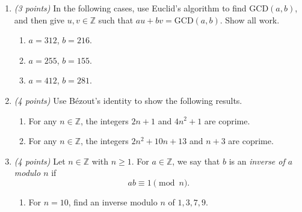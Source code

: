 \documentclass[12pt]{article}
\newcommand{\GCD}{\mathrm{GCD}}
\begin{document}
\begin{enumerate}

\item \emph{(3 points)} In the following cases, use Euclid's algorithm to find \( \GCD(a,b) \), and then give \( u, v \in \mathbb{Z} \) such that \( a u + b v = \GCD(a,b) \). Show all work.

\begin{enumerate}
\item \( a = 312 \), \( b = 216 \). \newline


\item \( a = 255 \), \( b = 155 \). \newline


\item \( a = 412 \), \( b = 281 \). \newline


\end{enumerate}

\item \emph{(4 points)} Use B\'ezout's identity to show the following results.

\begin{enumerate}
\item For any \( n \in \mathbb{Z} \), the integers \( 2n + 1 \) and \( 4n^2 + 1 \) are coprime. \newline


\item For any \( n \in \mathbb{Z} \), the integers \( 2n^2 + 10n + 13 \) and \( n + 3 \) are coprime. \newline

\end{enumerate}

\item \emph{(4 points)} Let \( n \in \mathbb{Z} \) with \( n \geq 1 \). For \( a \in \mathbb{Z} \), we say that \( b \) is an \textit{inverse of \( a \) modulo \( n \)} if
\[
ab \equiv 1 \pmod{n}.
\] 
\begin{enumerate}
\item For \( n = 10 \), find an inverse modulo \( n \) of \( 1, 3, 7, 9 \). \newline


\end{enumerate}
\end{enumerate}
\end{document}
